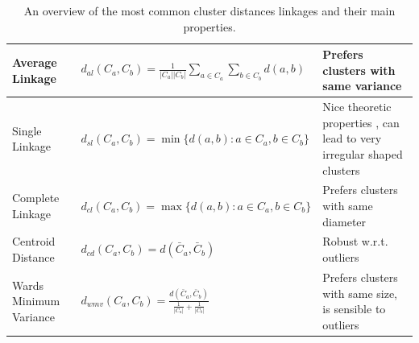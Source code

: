 \begin{table}
\begin{scriptsize}
\begin{tabular}{ |l|l|p{5cm}|}
    \hline
    Average Linkage \citep{sokal_1958_science_bulletin}           
        & $d_{al}(C_a,C_b) = \frac{1}{|C_a||C_b|} \sum _{a \in C_a} \sum_{b \in C_b} d(a,b) $ 
        & \scriptsize Prefers clusters with same variance \cite{sokal_1958_science_bulletin} \\ \hline

    Single Linkage \citep{florek_1951}            
        & $d_{sl}(C_a,C_b) =  \min\{d(a,b) : a \in C_a, b \in C_b\}$ 
        & Nice theoretic properties \citep{hartigan_1981_jjamstat,milligan_1980_psycho}, can lead
          to very irregular shaped clusters \\ \hline
    Complete Linkage \citep{sorensen_1948}         
        & $d_{cl}(C_a,C_b) =  \max\{d(a,b) : a \in C_a, b \in C_b\}$ 
        & Prefers clusters with same diameter \citep{milligan_1980_psycho} \\ \hline
    Centroid Distance         
        & $d_{cd}(C_a,C_b) =  d(\bar{C}_a,\bar{C}_b) $ 
        & Robust w.r.t. outliers \citep{milligan_1980_psycho} \\ \hline
    Wards Minimum Variance \citep{ward_63_jasa}
        & $d_{wmv}(C_a,C_b) = \frac{ d(\bar{C}_a,\bar{C}_b)}{ \frac{1}{|C_a|} + \frac{1}{|C_b|} } $ 
        & Prefers clusters with same size, is sensible to outliers \citep{milligan_1980_psycho} \\ \hline
\end{tabular}

\end{scriptsize}
\caption{
    An overview of the most common cluster distances linkages and their main properties.
}\label{tab:hc_linkage_types}
\end{table}






